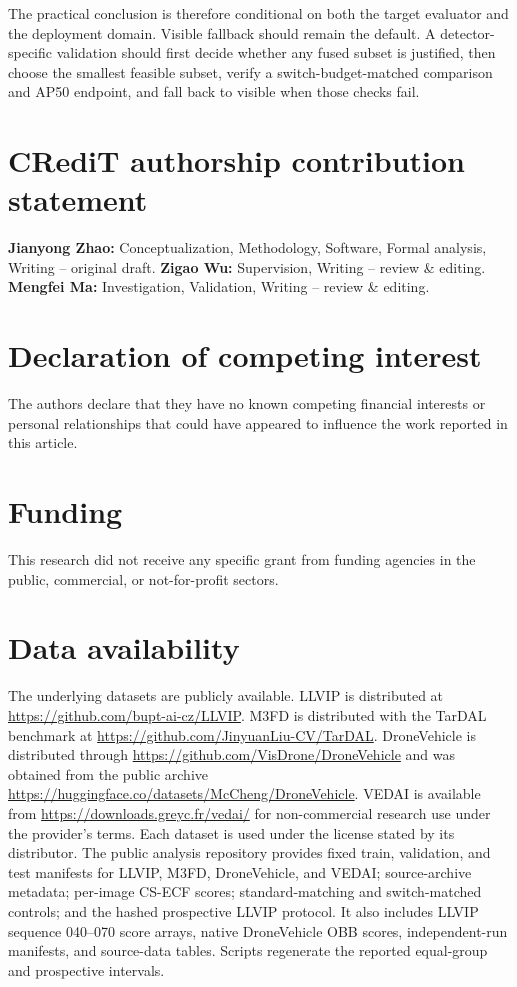 \documentclass[preprint,11pt]{elsarticle}
\begin{document}
The practical conclusion is therefore conditional on both the target
evaluator and the deployment domain. Visible fallback should remain the
default. A detector-specific validation should first decide whether any fused
subset is justified, then choose the smallest feasible subset, verify a
switch-budget-matched comparison and AP50 endpoint, and fall back to visible
when those checks fail.

\section*{CRediT authorship contribution statement}

\textbf{Jianyong Zhao:} Conceptualization, Methodology, Software, Formal
analysis, Writing -- original draft. \textbf{Zigao Wu:} Supervision, Writing
-- review \& editing. \textbf{Mengfei Ma:} Investigation, Validation,
Writing -- review \& editing.

\section*{Declaration of competing interest}

The authors declare that they have no known competing financial interests or
personal relationships that could have appeared to influence the work reported
in this article.

\section*{Funding}

This research did not receive any specific grant from funding agencies in the
public, commercial, or not-for-profit sectors.

\section*{Data availability}

The underlying datasets are publicly available. LLVIP is distributed at
\url{https://github.com/bupt-ai-cz/LLVIP}. M3FD is distributed with the TarDAL
benchmark at \url{https://github.com/JinyuanLiu-CV/TarDAL}. DroneVehicle is
distributed through \url{https://github.com/VisDrone/DroneVehicle} and was
obtained from the public archive
\url{https://huggingface.co/datasets/McCheng/DroneVehicle}. VEDAI is available
from \url{https://downloads.greyc.fr/vedai/} for non-commercial research use
under the provider's terms. Each dataset is used under the license stated by
its distributor. The public analysis repository provides fixed train,
validation, and test manifests for LLVIP, M3FD, DroneVehicle, and VEDAI;
source-archive metadata; per-image CS-ECF scores; standard-matching and
switch-matched controls; and the hashed prospective LLVIP protocol. It also
includes LLVIP sequence 040--070 score arrays, native DroneVehicle OBB scores,
independent-run manifests, and source-data tables. Scripts regenerate the
reported equal-group and prospective intervals.
\end{document}
